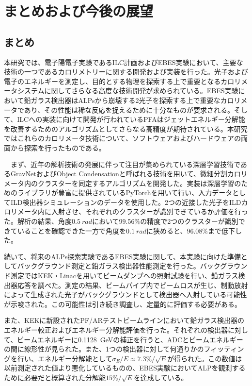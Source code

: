 
\chapter{まとめおよび今後の展望} \label{sec:Conclusion}

\section{まとめ}
本研究では、電子陽電子実験であるILC計画およびEBES実験において、主要な技術の一つであるカロリメトリーに関する開発および実装を行った。光子および電子のエネルギーを測定し、目的とする物理を探索する上で重要となるカロリメータシステムに関してさらなる高度な技術開発が求められている。EBES実験において鉛ガラス検出器はALPsから崩壊する2光子を探索する上で重要なカロリメータであり、その性能は稀な反応を捉えるために十分なものが要求される。そして、ILCへの実装に向けて開発が行われているPFAはジェットエネルギー分解能を改善するためのアルゴリズムとしてさらなる高精度が期待されている。本研究ではこれらのカロリメータ技術について、ソフトウェアおよびハードウェアの両面から探索を行ったものである。

　まず、近年の解析技術の発展に伴って注目が集められている深層学習技術であるGravNetおよびObject Condensationと呼ばれる技術を用いて、微細分割カロリメータ内のクラスターを同定するアルゴリズムを開発した。実装は深層学習のためのライブラリが豊富に提供されているPyTorchを用いて行い、入力データとしてILD検出器シミュレーションのデータを使用した。2つの近接した光子をILDカロリメータ内に入射させ、それぞれのクラスターが識別できているか評価を行った。解析の結果、角度$\SI{0.5}{rad}$において99.56\%の精度で2つのクラスターが識別できていることを確認できた一方で角度を$\SI{0.1}{rad}$に狭めると、96.08\%まで低下した。

続いて、将来のALPs探索実験であるEBES実験に関して、本実験に向けた準備としてバックグラウンド測定と鉛ガラス検出器性能測定を行った。バックグラウンド測定ではKEK・Linacを用いてビームダンプへの照射試験を行い、鉛ガラス検出器応答を調べた。測定の結果、ビームパイプ内でビームロスが生じ、制動放射によって生成された光子がバックグラウンドとして検出器へ入射している可能性が示唆された。この可能性は引き続き調査し、定量的に評価する必要がある。

また、KEKに新設されたPF/ARテストビームラインにおいて鉛ガラス検出器のエネルギー較正およびエネルギー分解能評価を行った。それぞれの検出器に対して、ビームエネルギーに\SI{0.1128}{GeV}の補正を行うと、ADCとビームエネルギーの間に線形性が見られた。また、1つの検出器に対して何通りかのフィッティングを行い、エネルギー分解能として$\sigma_E/E\approx7.3\%/\sqrt{E}$が得られた。この数値は以前測定された値より悪化しているものの、EBES実験においてALPを観測するために必要だと概算された分解能$15\%/\sqrt{E}$を達成している。


